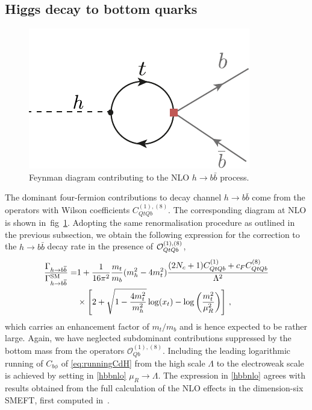 \subsection{Higgs decay to bottom quarks}
\begin{figure}[t!]
	\vspace{-.5 cm}
	\centering
	\includegraphics[scale=0.85]{./fig/Hbb}
	\caption{Feynman diagram contributing to the NLO   $h \to b \bar b$ process. }
	\label{hbb}
\end{figure}
The dominant four-fermion contributions to decay channel $h \to b\bar b$ come from the operators with Wilson coefficients $C_{QtQb}^{(1),(8)}$. The corresponding diagram at NLO is shown in~fig~\ref{hbb}. 
Adopting the same renormalisation procedure as outlined in the previous subsection, we obtain the following expression for the correction to 
the $h \to b\bar b$ decay rate in the presence of ${\cal O}_{QtQb}^{(1),(8)}$,
\begin{equation}
	\begin{split}
		\frac{\Gamma_{h\to b\overline{b}}}{\Gamma_{h\to b\overline{b}}^{\mathrm{SM}}}=& 1+ \frac{1}{16\pi^2}\frac{m_t}{m_b}(m_h^2-4m_t^2)\frac{(2 N_c+1) C_{QtQb}^{(1)}+c_F C_{QtQb}^{(8)}}{\Lambda^2} \\ & \times\left[ 2+\sqrt{1-\frac{4 m_t^2}{m_h^2}}\log(x_t)-\log\left(\frac{m_t^2}{\mu_R^2}\right) \right] \,,
		\label{hbbnlo}
	\end{split}
\end{equation}
which carries an enhancement factor of $m_t/m_b$ and is hence expected to be rather large.
Again, we have neglected subdominant contributions suppressed by the bottom mass from the operators $\mathcal{O}_{Qb}^{(1),(8)}$. 
Including the leading logarithmic running of $C_{b\phi}$ of \eqref{eq:runningCdH} from the high scale $\Lambda$ to the electroweak scale is achieved by setting in \eqref{hbbnlo} $\mu_R\to \Lambda$.
The expression in \eqref{hbbnlo} agrees with results obtained from the full calculation of the NLO effects in the dimension-six SMEFT, first computed in~\cite{Gauld:2015lmb}. 

